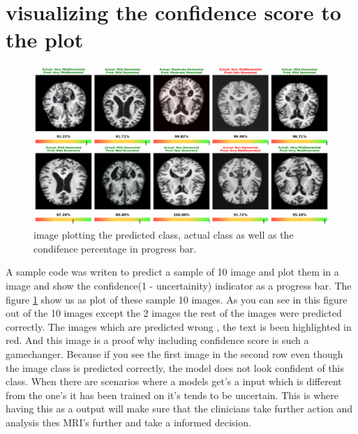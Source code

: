 \documentclass[12pt,onecolumn]{report}
\begin{document}
\section{visualizing the confidence score to the plot}
\begin{figure}[H]
    \centering
    \includegraphics[width=0.8\columnwidth]{figures/res_uncertainity_sample_plot.png}  %
    \caption{image plotting the predicted class, actual class as well as the condifence percentage in progress bar.} %
    \label{fig:res_uncertainity_sample_plot} %
\end{figure}
A sample code was writen to predict a sample of 10 image and plot them in a image and show the confidence(1 - uncertainity) indicator  as a progress bar. The figure \ref{fig:res_uncertainity_sample_plot} show us as plot of these sample 10 images. As you can see in this figure out of the 10 images except the 2 images the rest of the images were predicted correctly. The images which are predicted wrong , the text is been highlighted in red. And this image is a proof why including confidence score is such a gamechanger. Because if you see the first image in the second row even though the image class is predicted correctly, the model does not look confident of this class. When there are scenarios where a models get's a input which is different from the one's it has been trained on it's tends to be uncertain. This is where having this as a output will make sure that the clinicians take further action and analysis thes MRI's further and take a informed decision.
\end{document}
